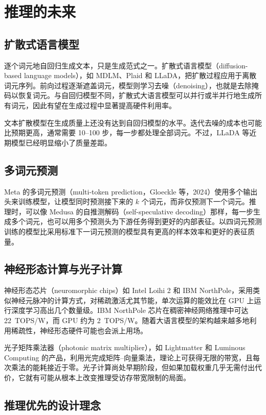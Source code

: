 \chapter{推理的未来}

\section{扩散式语言模型}

逐个词元地自回归生成文本，只是生成范式之一。扩散式语言模型（diffusion-based language models），如 MDLM、Plaid 和 LLaDA，把扩散过程应用于离散词元序列。前向过程逐渐遮盖词元，模型则学习去噪（denoising），也就是去除掩码以恢复词元。与自回归模型不同，扩散式大语言模型可以并行或半并行地生成所有词元，因此有望在生成过程中显著提高硬件利用率。

文本扩散模型在生成质量上还没有达到自回归模型的水平。迭代去噪的成本也可能比预期更高，通常需要 10–100 步，每一步都处理全部词元。不过，LLaDA 等近期模型已经明显缩小了质量差距。

\section{多词元预测}

Meta 的多词元预测（multi-token prediction，Gloeckle 等，2024）使用多个输出头来训练模型，让模型同时预测接下来的 $k$ 个词元，而非仅预测下一个词元。推理时，可以像 Medusa 的自推测解码（self-speculative decoding）那样，每一步生成多个词元，也可以用多个预测头为下游任务得到更好的内部表征。以四词元预测训练的模型比采用标准下一词元预测的模型具有更高的样本效率和更好的表征质量。

\section{神经形态计算与光子计算}

神经形态芯片（neuromorphic chips）如 Intel Loihi 2 和 IBM NorthPole，采用类似神经元脉冲的计算方式，对稀疏激活尤其节能，单次运算的能效比在 GPU 上运行深度学习高出几个数量级。IBM NorthPole 芯片在稠密神经网络推理中可达 22~TOPS/W，而 GPU 约为 2~TOPS/W。随着大语言模型的架构越来越多地利用稀疏性，神经形态硬件可能也会派上用场。

光子矩阵乘法器（photonic matrix multiplier），如 Lightmatter 和 Luminous Computing 的产品，利用光完成矩阵–向量乘法，理论上可获得无限的带宽，且每次乘法的能耗接近于零。光子计算尚处早期阶段，但如果加载权重几乎无需付出代价，它就有可能从根本上改变推理受访存带宽限制的局面。

\section{推理优先的设计理念}


